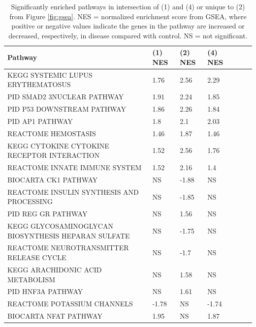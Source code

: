 \documentclass[fleqn,10pt,table]{wlscirep}
\begin{document}
\begin{table}[ht]
\centering
{}
\begin{tabular}{|l|l|l|l|l|l|l|} \hline
Pathway & (1) NES & (2) NES & (4) NES \\ \hline
KEGG SYSTEMIC LUPUS ERYTHEMATOSUS & 1.76 & 2.56 & 2.29 \\ \hline
PID SMAD2 3NUCLEAR PATHWAY & 1.91 & 2.24 & 1.85 \\ \hline
PID P53 DOWNSTREAM PATHWAY & 1.86 & 2.26 & 1.84 \\ \hline
PID AP1 PATHWAY & 1.8 & 2.1 & 2.03 \\ \hline
REACTOME HEMOSTASIS & 1.46 & 1.87 & 1.46 \\ \hline
KEGG CYTOKINE CYTOKINE RECEPTOR INTERACTION & 1.52 & 2.56 & 1.76 \\ \hline
REACTOME INNATE IMMUNE SYSTEM & 1.52 & 2.16 & 1.4 \\ \hline
BIOCARTA CK1 PATHWAY & NS & -1.88 & NS \\ \hline
REACTOME INSULIN SYNTHESIS AND PROCESSING & NS & -1.85 & NS \\ \hline
PID REG GR PATHWAY & NS & 1.56 & NS \\ \hline
KEGG GLYCOSAMINOGLYCAN BIOSYNTHESIS HEPARAN SULFATE & NS & -1.75 & NS \\ \hline
REACTOME NEUROTRANSMITTER RELEASE CYCLE & NS & -1.7 & NS \\ \hline
KEGG ARACHIDONIC ACID METABOLISM & NS & 1.58 & NS \\ \hline
PID HNF3A PATHWAY & NS & 1.61 & NS \\ \hline
REACTOME POTASSIUM CHANNELS & -1.78 & NS & -1.74 \\ \hline
BIOCARTA NFAT PATHWAY & 1.95 & NS & 1.87 \\ \hline
\end{tabular}
\caption{Significantly enriched pathways in intersection of (1) and (4) or unique to (2) from Figure \ref{fig:gsea}. NES = normalized enrichment score from GSEA, where positive or negative values indicate the genes in the pathway are increased or decreased, respectively, in disease compared with control. NS = not significant.\label{tab:gsea}}
\end{table}
\end{document}
